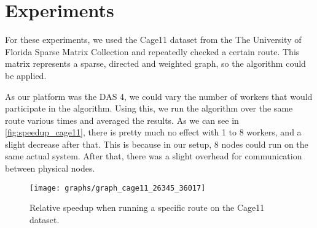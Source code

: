 \chapter{Experiments}

For these experiments, we used the Cage11 dataset from the The University of Florida Sparse Matrix Collection and repeatedly checked a certain route.%
This matrix represents a sparse, directed and weighted graph, so the algorithm could be applied.

As our platform was the DAS 4, we could vary the number of workers that would participate in the algorithm. Using this, we run the algorithm over the same route various times and averaged the results. As we can see in \autoref{fig:speedup_cage11}, there is pretty much no effect with 1 to 8 workers, and a slight decrease after that. This is because in our setup, 8 nodes could run on the same actual system. After that, there was a slight overhead for communication between physical nodes.

\begin{figure}
  \texttt{[image: graphs/graph\_cage11\_26345\_36017]}
  \caption{Relative speedup when running a specific route on the Cage11 dataset.}
  \label{fig:speedup_cage11}
\end{figure}
